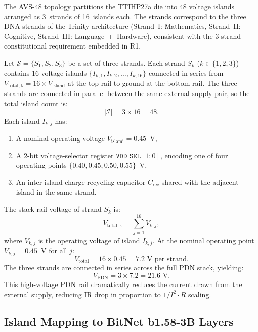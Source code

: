 The AVS-48 topology partitions the TTIHP27a die into 48 voltage islands
arranged as 3~strands of 16~islands each.  The strands correspond to the
three DNA strands of the Trinity architecture (Strand~I: Mathematics,
Strand~II: Cognitive, Strand~III: Language~+~Hardware), consistent with
the 3-strand constitutional requirement embedded in R1.

\begin{definition}
\label{def:avs48_topology}
Let $\mathcal{S} = \{S_1, S_2, S_3\}$ be a set of three strands.  Each
strand $S_k$ ($k \in \{1,2,3\}$) contains 16 voltage islands
$\{I_{k,1}, I_{k,2}, \ldots, I_{k,16}\}$ connected in series from
$V_\mathrm{total,k} = 16 \times V_\mathrm{island}$ at the top rail
to ground at the bottom rail.  The three strands are connected in
parallel between the same external supply pair, so the total island
count is:
\[
  |\mathcal{I}| = 3 \times 16 = 48.
\]
Each island $I_{k,j}$ has:
\begin{enumerate}
  \item A nominal operating voltage $V_\mathrm{island} = 0.45$~V,
  \item A 2-bit voltage-selector register $\mathtt{VDD\_SEL}[1:0]$,
    encoding one of four operating points $\{0.40, 0.45, 0.50, 0.55\}$~V,
  \item An inter-island charge-recycling capacitor $C_\mathrm{rec}$
    shared with the adjacent island in the same strand.
\end{enumerate}
\end{definition}

\begin{definition}
\label{def:stack_rail_voltage}
The stack rail voltage of strand $S_k$ is:
\[
  V_\mathrm{total,k} = \sum_{j=1}^{16} V_{k,j},
\]
where $V_{k,j}$ is the operating voltage of island $I_{k,j}$.  At
the nominal operating point $V_{k,j} = 0.45$~V for all $j$:
\[
  V_\mathrm{total} = 16 \times 0.45 = 7.2\text{ V per strand}.
\]
The three strands are connected in series across the full PDN stack,
yielding:
\[
  V_\mathrm{PDN} = 3 \times 7.2 = 21.6\text{ V}.
\]
This high-voltage PDN rail dramatically reduces the current drawn
from the external supply, reducing IR drop in proportion to
$1/I^2 \cdot R$ scaling.
\end{definition}

\subsection{Island Mapping to BitNet b1.58-3B Layers}

